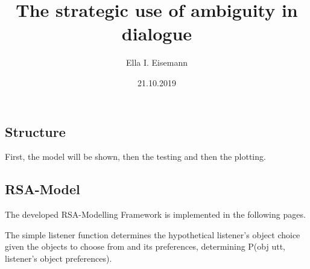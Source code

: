 \documentclass[]{article}
\title{The strategic use of ambiguity in dialogue}
\author{Ella I. Eisemann}
\date{21.10.2019}
\newenvironment{Shaded}{\begin{snugshade}}{\end{snugshade}}
\newcommand{\ControlFlowTok}[1]{\textcolor[rgb]{0.13,0.29,0.53}{\textbf{#1}}}
\newcommand{\DataTypeTok}[1]{\textcolor[rgb]{0.13,0.29,0.53}{#1}}
\newcommand{\DecValTok}[1]{\textcolor[rgb]{0.00,0.00,0.81}{#1}}
\newcommand{\FloatTok}[1]{\textcolor[rgb]{0.00,0.00,0.81}{#1}}
\newcommand{\KeywordTok}[1]{\textcolor[rgb]{0.13,0.29,0.53}{\textbf{#1}}}
\newcommand{\NormalTok}[1]{#1}
\newcommand{\OperatorTok}[1]{\textcolor[rgb]{0.81,0.36,0.00}{\textbf{#1}}}
\newcommand{\StringTok}[1]{\textcolor[rgb]{0.31,0.60,0.02}{#1}}
\begin{document}
\maketitle

\hypertarget{structure}{%
\subsection{Structure}\label{structure}}

First, the model will be shown, then the testing and then the plotting.

\hypertarget{rsa-model}{%
\subsection{RSA-Model}\label{rsa-model}}

The developed RSA-Modelling Framework is implemented in the following
pages.

The simple listener function determines the hypothetical listener's
object choice given the objects to choose from and its preferences,
determining P(obj \textbar{} utt, listener's object preferences).

\begin{Shaded}
\end{Shaded}
\end{document}
